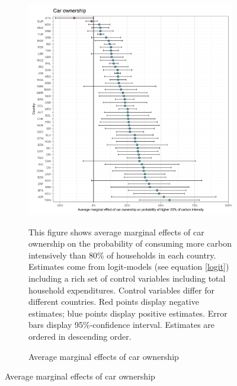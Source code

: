  \begin{figure}[ht!]\ContinuedFloat
   \centering
   \begin{subfigure}[b]{\textwidth}
   \centering
   \caption{Average marginal effects of car ownership} \label{fig:Logit_ME_car}
   \includegraphics{1_Figures/Analysis_Logit_Models_Marginal_Effects/Average_Marginal_Effects_affected_upper_80_car.01_2017.jpg}
   \begin{subcaption2}
     This figure shows average marginal effects of car ownership on the probability of consuming more carbon intensively than 80\% of households in each country. Estimates come from logit-models (see equation \ref{logit}) including a rich set of control variables including total household expenditures. Control variables differ for different countries. Red points display negative estimates; blue points display positive estimates. Error bars display 95\%-confidence interval. Estimates are ordered in descending order.
   \end{subcaption2}
   \end{subfigure}
 \end{figure}
 \clearpage

